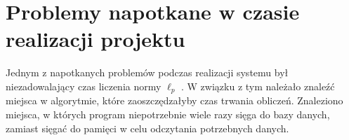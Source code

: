 \documentclass[pdflatex,11pt]{../aghdoc_version2}
\begin{document}
\section{Problemy napotkane w czasie realizacji projektu}
Jednym z napotkanych problemów podczas realizacji systemu był niezadowalający czas
liczenia normy $\ell_p$ . W związku z tym należało znaleźć miejsca w algorytmie, które
zaoszczędzałyby czas trwania obliczeń. Znaleziono miejsca, w których program
niepotrzebnie wiele razy sięga do bazy danych, zamiast sięgać do pamięci w celu
odczytania potrzebnych danych.
% 
% 



%
%
%
%
\end{document}
